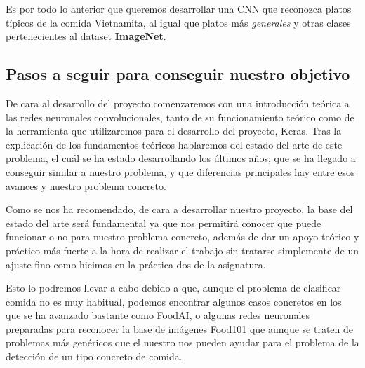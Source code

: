 \vspace{3 mm}

Es por todo lo anterior que queremos desarrollar una CNN que reconozca platos típicos de la comida Vietnamita, al igual que platos más \textit{generales} y otras clases pertenecientes al dataset \textbf{ImageNet}.

\newpage

\subsection{Pasos a seguir para conseguir nuestro objetivo}

De cara al desarrollo del proyecto comenzaremos con una introducción teórica a las redes neuronales convolucionales, tanto de su funcionamiento teórico como de la herramienta que utilizaremos para el desarrollo del proyecto, Keras. Tras la explicación de los fundamentos teóricos hablaremos del estado del arte de este problema, el cuál se ha estado desarrollando los últimos años; que se ha llegado a conseguir similar a nuestro problema, y que diferencias principales hay entre esos avances y nuestro problema concreto.

Como se nos ha recomendado, de cara a desarrollar nuestro proyecto, la base del estado del arte será fundamental ya que nos permitirá conocer que puede funcionar o no para nuestro problema concreto, además de dar un apoyo teórico y práctico más fuerte a la hora de realizar el trabajo sin tratarse simplemente de un ajuste fino como hicimos en la práctica dos de la asignatura.

Esto lo podremos llevar a cabo debido a que, aunque el problema de clasificar comida no es muy habitual, podemos encontrar algunos casos concretos en los que se ha avanzado bastante como FoodAI, o algunas redes neuronales preparadas para reconocer la base de imágenes Food101 que aunque se traten de problemas más genéricos que el nuestro nos pueden ayudar para el problema de la detección de un tipo concreto de comida.
